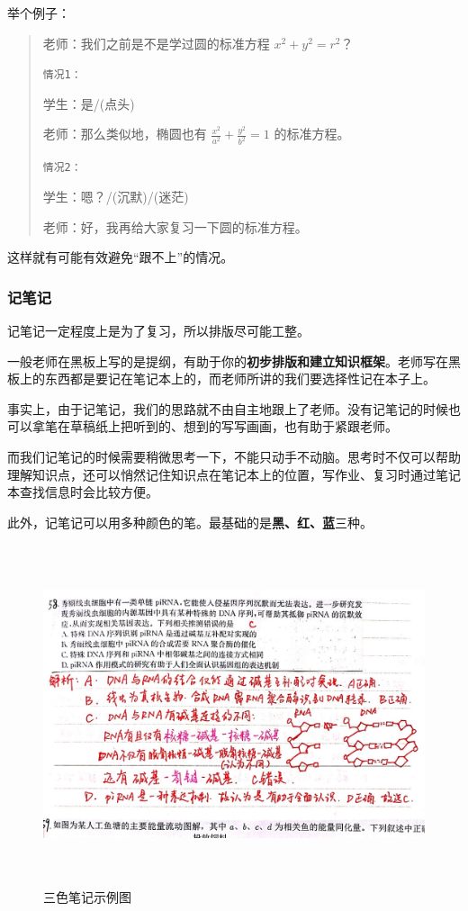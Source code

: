 \documentclass[UTF8,11pt,a4paper]{ctexart}
\begin{document}
				举个例子：
				
				\begin{quote}
					老师：我们之前是不是学过圆的标准方程 $x^2+y^2=r^2$？
					
					\texttt{情况1：}
					
					学生：是/(点头)
					
					老师：那么类似地，椭圆也有 $\frac{x^2}{a^2}+\frac{y^2}{b^2}=1$ 的标准方程。
					
					\texttt{情况2：}
					
					学生：嗯？/(沉默)/(迷茫)
					
					老师：好，我再给大家复习一下圆的标准方程。
					
				\end{quote}
			
				这样就有可能有效避免“跟不上”的情况。
			\subsubsection{记笔记}
				记笔记一定程度上是为了复习，所以排版尽可能工整。
				
				一般老师在黑板上写的是提纲，有助于你的\textbf{初步排版和建立知识框架}。老师写在黑板上的东西都是要记在笔记本上的，而老师所讲的我们要选择性记在本子上。
				
				事实上，由于记笔记，我们的思路就不由自主地跟上了老师。没有记笔记的时候也可以拿笔在草稿纸上把听到的、想到的写写画画，也有助于紧跟老师。
				
				而我们记笔记的时候需要稍微思考一下，不能只动手不动脑。思考时不仅可以帮助理解知识点，还可以悄然记住知识点在笔记本上的位置，写作业、复习时通过笔记本查找信息时会比较方便。
				
				此外，记笔记可以用多种颜色的笔。最基础的是\textbf{黑、{\color{red}红}、{\color{blue}蓝}}三种。
				
				\begin{figure}[h]
					\centering
					\includegraphics[width=14cm,height=10cm]{IMG_3110.JPG}
					
					\caption{三色笔记示例图}
				\end{figure}
\end{document}
